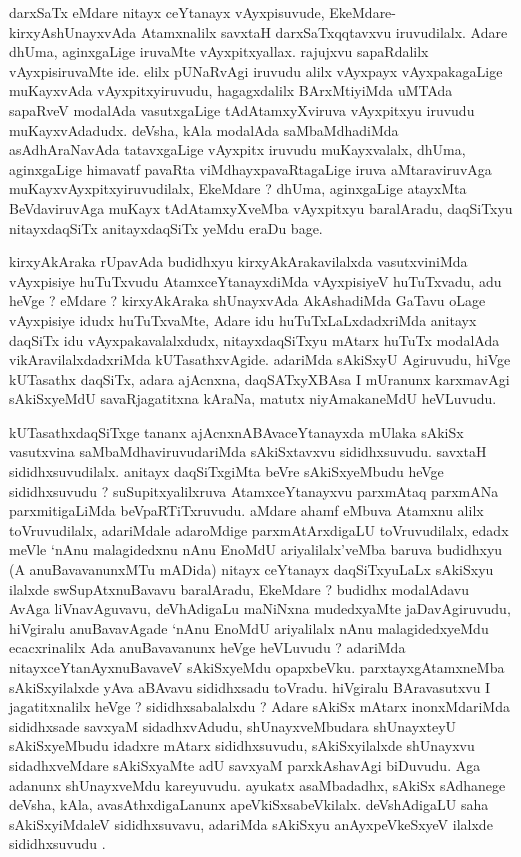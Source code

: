 \begin{artha}
darxSaTx eMdare nitayx ceYtanayx vAyxpisuvude, EkeMdare-kirxyAshUnayxvAda Atamxnalilx savxtaH darxSaTxqqtavxvu iruvudilalx. Adare dhUma, aginxgaLige iruvaMte vAyxpitxyallax. rajujxvu sapaRdalilx vAyxpisiruvaMte ide. elilx pUNaRvAgi iruvudu alilx vAyxpayx vAyxpakagaLige muKayxvAda vAyxpitxyiruvudu, hagagxdalilx BArxMtiyiMda uMTAda sapaRveV modalAda vasutxgaLige tAdAtamxyXviruva vAyxpitxyu iruvudu muKayxvAdadudx. deVsha, kAla modalAda saMbaMdhadiMda asAdhAraNavAda tatavxgaLige vAyxpitx iruvudu muKayxvalalx, dhUma, aginxgaLige himavatf pavaRta viMdhayxpavaRtagaLige iruva aMtaraviruvAga muKayxvAyxpitxyiruvudilalx, EkeMdare ? dhUma, aginxgaLige atayxMta BeVdaviruvAga muKayx tAdAtamxyXveMba vAyxpitxyu baralAradu, daqSiTxyu nitayxdaqSiTx anitayxdaqSiTx yeMdu eraDu bage.
\end{artha}

\begin{artha}
kirxyAkAraka rUpavAda budidhxyu kirxyAkArakavilalxda vasutxviniMda vAyxpisiye huTuTxvudu AtamxceYtanayxdiMda vAyxpisiyeV huTuTxvadu, adu heVge ? eMdare ? kirxyAkAraka shUnayxvAda AkAshadiMda GaTavu oLage vAyxpisiye idudx huTuTxvaMte, Adare idu huTuTxLaLxdadxriMda anitayx daqSiTx idu vAyxpakavalalxdudx, nitayxdaqSiTxyu mAtarx huTuTx modalAda vikAravilalxdadxriMda kUTasathxvAgide. adariMda sAkiSxyU Agiru\-vudu, hiVge kUTasathx daqSiTx, adara ajAcnxna, daqSATxyXBAsa I mUranunx karxmavAgi sAkiSxyeMdU savaRjagatitxna kAraNa, matutx niyAmakaneMdU heVLuvudu.
\end{artha}

\begin{artha}
kUTasathxdaqSiTxge tananx ajAcnxnABAvaceYtanayxda mUlaka sAkiSx vasutxvina saMbaMdha\-viruvudariMda sAkiSxtavxvu sididhxsuvudu. savxtaH sididhxsuvudilalx. anitayx daqSiTxgiMta beVre sAkiSxyeMbudu heVge sididhxsuvudu ? suSupitxyalilxruva AtamxceYtanayxvu parxmAtaq parxmANa parxmitigaLiMda beVpaRTiTxruvudu. aMdare ahamf eMbuva Atamxnu alilx toVruvudilalx, adariMdale adaroMdige parxmAtArxdigaLU toVruvudilalx, edadx meVle `nAnu malagidedxnu nAnu EnoMdU ariyalilalx'veMba baruva budidhxyu (A anuBavavanunxMTu mADida) nitayx ceYtanayx daqSiTxyuLaLx sAkiSxyu ilalxde swSupAtxnuBavavu baralAradu, EkeMdare ? budidhx modalAdavu AvAga liVnavAguvavu, deVhAdigaLu maNiNxna mudedxyaMte jaDavAgiruvudu, hiVgiralu anuBavavAgade `nAnu EnoMdU ariyalilalx nAnu malagidedxyeMdu ecacxrinalilx Ada anuBavavanunx heVge heVLuvudu ? adariMda nitayxceYtanAyxnuBavaveV sAkiSxyeMdu opapxbeVku. parxtayxgAtamxneMba sAkiSxyilalxde yAva aBAvavu sididhxsadu toVradu. hiVgiralu BAravasutxvu I jagatitxnalilx heVge ? sididhxsabalalxdu ? Adare sAkiSx mAtarx inonxMdariMda sididhxsade savxyaM sidadhxvAdudu, shUnayxveMbudara shUnayxteyU sAkiSxyeMbudu idadxre mAtarx sididhxsuvudu, sAkiSxyilalxde shUnayxvu sidadhxveMdare sAkiSxyaMte adU savxyaM parxkAshavAgi biDuvudu. Aga adanunx shUnayxveMdu kareyuvudu. ayukatx asaMbadadhx, sAkiSx sAdhanege deVsha, kAla, avasAthxdigaLanunx apeVkiSxsabeVkilalx. deVshAdigaLU saha sAkiSxyiMdaleV sididhxsuvavu, adariMda sAkiSxyu anAyxpeVkeSxyeV ilalxde sididhxsuvudu .
\end{artha}

